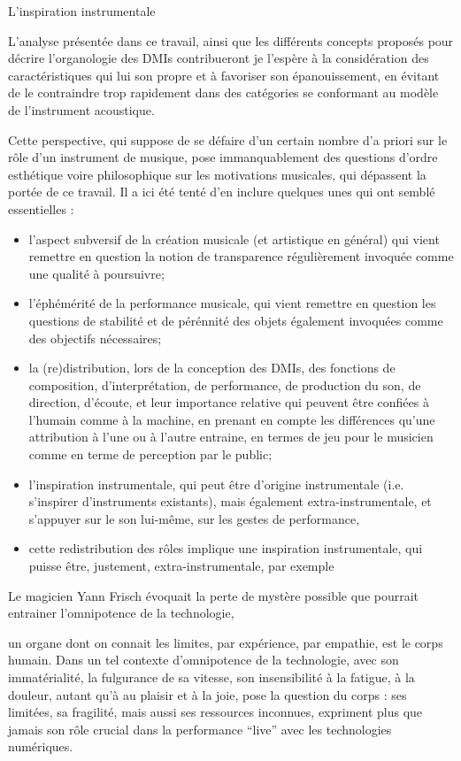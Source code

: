 L'inspiration instrumentale

L'analyse présentée dans ce travail, ainsi que les différents concepts proposés pour décrire l'organologie des \glspl{DMI} contribueront je l'espère à la considération des caractéristiques qui lui son propre et à favoriser son épanouissement, en évitant de le contraindre trop rapidement dans des catégories se conformant au modèle de l'instrument acoustique. 

Cette perspective, qui suppose de se défaire d'un certain nombre d'a priori sur le rôle d'un instrument de musique, pose immanquablement des questions d'ordre esthétique voire philosophique sur les motivations musicales, qui dépassent la portée de ce travail. Il a ici été tenté d'en inclure quelques unes qui ont semblé essentielles : 
\begin{itemize}[noitemsep]
	\item l'aspect subversif de la création musicale (et artistique en général) qui vient remettre en question la notion de transparence régulièrement invoquée comme une qualité à poursuivre;
	\item l'éphémérité de la performance musicale, qui vient remettre en question les questions de stabilité et de pérénnité des objets également invoquées comme des objectifs nécessaires;
	\item la (re)distribution, lors de la conception des \glspl{DMI}, des fonctions de composition, d'interprétation, de performance, de production du son, de direction, d'écoute, et leur importance relative qui peuvent être confiées à l'humain comme à la machine, en prenant en compte les différences qu'une attribution à l'une ou à l'autre entraine, en termes de jeu pour le musicien comme en terme de perception par le public;
	\item l'inspiration instrumentale, qui peut être d'origine instrumentale (i.e. s'inspirer d'instruments existants), mais également extra-instrumentale, et s'appuyer sur le son lui-même, sur les gestes de performance,
	\item cette redistribution des rôles implique une inspiration instrumentale, qui puisse être, justement, extra-instrumentale, par exemple
\end{itemize}


Le magicien Yann Frisch évoquait la perte de mystère possible que pourrait entrainer l'omnipotence de la technologie,

un organe dont on connait les limites, par expérience, par empathie, est le corps humain. 
Dans un tel contexte d'omnipotence de la technologie, avec son immatérialité, la fulgurance de sa vitesse, son insensibilité à la fatigue, à la douleur, autant qu'à au plaisir et à la joie, pose la question du corps : ses limitées, sa fragilité, mais aussi ses ressources inconnues, expriment plus que jamais son rôle crucial dans la performance ``live'' avec les technologies numériques.